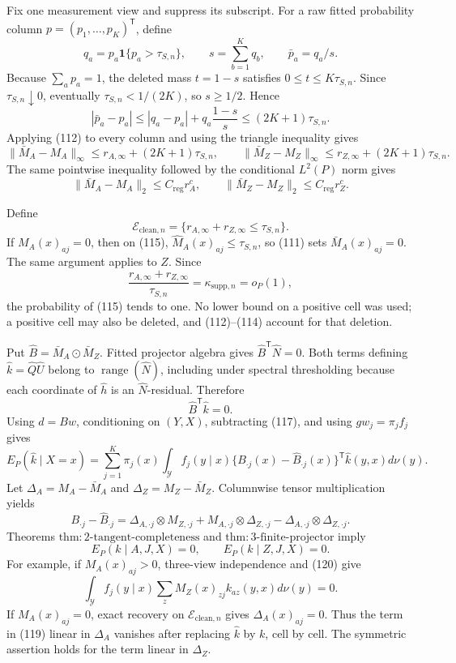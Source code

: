 Fix one measurement view and suppress its subscript.  For a raw fitted probability column \(p=(p_1,\ldots,p_K)^{\mathsf T}\), define
\[
 q_a=p_a\mathbf 1\{p_a>\tau_{S,n}\},\qquad
 s=\sum_{b=1}^Kq_b,\qquad \bar p_a=q_a/s. \tag{111}
\]
Because \(\sum_ap_a=1\), the deleted mass \(t=1-s\) satisfies
\(0\leq t\leq K\tau_{S,n}\).  Since \(\tau_{S,n}\downarrow0\), eventually
\(\tau_{S,n}<1/(2K)\), so \(s\geq1/2\).  Hence
\[
 |\bar p_a-p_a|
 \leq|q_a-p_a|+q_a\frac{1-s}{s}
 \leq(2K+1)\tau_{S,n}. \tag{112}
\]
Applying (112) to every column and using the triangle inequality gives
\[
 \|\bar M_A-M_A\|_\infty
 \leq r_{A,\infty}+(2K+1)\tau_{S,n},\qquad
 \|\bar M_Z-M_Z\|_\infty
 \leq r_{Z,\infty}+(2K+1)\tau_{S,n}. \tag{113}
\]
The same pointwise inequality followed by the conditional \(L^2(P)\) norm gives
\[
 \|\bar M_A-M_A\|_2\leq C_{\mathrm{reg}}r_A^c,\qquad
 \|\bar M_Z-M_Z\|_2\leq C_{\mathrm{reg}}r_Z^c. \tag{114}
\]

Define
\[
 \mathcal E_{\mathrm{clean},n}
 =\{r_{A,\infty}+r_{Z,\infty}\leq\tau_{S,n}\}. \tag{115}
\]
If \(M_A(x)_{aj}=0\), then on (115),
\(\widehat M_A(x)_{aj}\leq\tau_{S,n}\), so (111) sets
\(\bar M_A(x)_{aj}=0\).  The same argument applies to \(Z\).  Since
\[
 \frac{r_{A,\infty}+r_{Z,\infty}}{\tau_{S,n}}
 =\kappa_{\mathrm{supp},n}=o_P(1), \tag{116}
\]
the probability of (115) tends to one.  No lower bound on a positive cell was used; a positive cell may also be deleted, and (112)--(114) account for that deletion.

Put \(\widehat B=\bar M_A\odot\bar M_Z\).  Fitted projector algebra gives
\(\widehat B^{\mathsf T}\widehat N=0\).  Both terms defining
\(\widehat k=\widehat Q\widehat U\) belong to \(\operatorname{range}(\widehat N)\), including under spectral thresholding because each coordinate of \(\widehat h\) is an \(\widehat N\)-residual.  Therefore
\[
 \widehat B^{\mathsf T}\widehat k=0. \tag{117}
\]
Using \(d=Bw\), conditioning on \((Y,X)\), subtracting (117), and using \(gw_j=\pi_jf_j\) gives
\[
 E_P(\widehat k\mid X=x)
 =\sum_{j=1}^K\pi_j(x)\int_{\mathcal Y}f_j(y\mid x)
 \{B_{\cdot j}(x)-\widehat B_{\cdot j}(x)\}^{\mathsf T}
 \widehat k(y,x)d\nu(y). \tag{118}
\]
Let \(\Delta_A=M_A-\bar M_A\) and \(\Delta_Z=M_Z-\bar M_Z\).  Columnwise tensor multiplication yields
\[
 B_{\cdot j}-\widehat B_{\cdot j}
 =\Delta_{A,\cdot j}\otimes M_{Z,\cdot j}
 +M_{A,\cdot j}\otimes\Delta_{Z,\cdot j}
 -\Delta_{A,\cdot j}\otimes\Delta_{Z,\cdot j}. \tag{119}
\]
Theorems \(\mathrm{thm{:}2\mbox{-}tangent\mbox{-}completeness}\) and
\(\mathrm{thm{:}3\mbox{-}finite\mbox{-}projector}\) imply
\[
 E_P(k\mid A,J,X)=0,\qquad E_P(k\mid Z,J,X)=0. \tag{120}
\]
For example, if \(M_A(x)_{aj}>0\), three-view independence and (120) give
\[
 \int_{\mathcal Y}f_j(y\mid x)
 \sum_zM_Z(x)_{zj}k_{az}(y,x)d\nu(y)=0. \tag{121}
\]
If \(M_A(x)_{aj}=0\), exact recovery on \(\mathcal E_{\mathrm{clean},n}\) gives
\(\Delta_A(x)_{aj}=0\).  Thus the term in (119) linear in \(\Delta_A\) vanishes after replacing \(\widehat k\) by \(k\), cell by cell.  The symmetric assertion holds for the term linear in \(\Delta_Z\).

